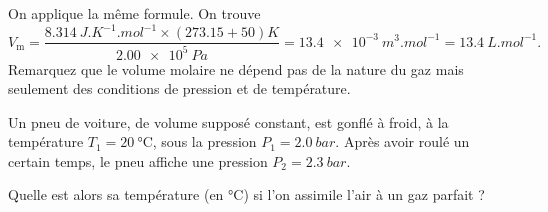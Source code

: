 
\begin{corrige}
On applique la même formule. On trouve 
\[
V_\text{m}=\frac{\SI{8,314}{J.K^{-1}.mol^{-1}}\times (\num{273.15}+50) \si{K}}{\SI{2.00e5}{Pa}}=\SI{13.4e-3}{m^3.mol^{-1}}=\SI{13.4}{L.mol^{-1}}.
\]
Remarquez que le volume molaire ne dépend pas de la nature du gaz mais seulement des conditions de pression et de température.
\end{corrige}



\finEntrainement


\newpage




\hauteurLargeurCadreReponse		{7mm}{25mm}
\initialisationEntrainement

Un pneu de voiture, de volume supposé constant, est gonflé à froid, à la température $T_{1}=\SI{20}{\celsius}$, sous la pression $P_{1}=\SI{2.0}{bar}$. Après avoir roulé un certain temps, le pneu affiche une pression $P_{2}=\SI{2.3}{bar}$. 


\debutEntrainement

\begin{enonce}
Quelle est alors sa température (en $\si{\celsius}$) si l'on assimile l'air à un gaz parfait ?
\end{enonce}

